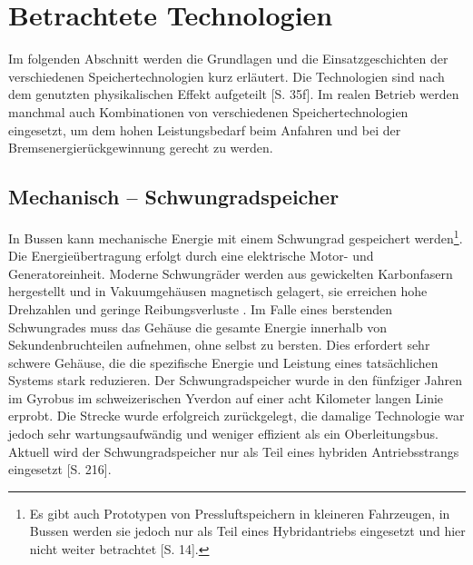 \section{Betrachtete Technologien}
Im folgenden Abschnitt werden die Grundlagen und die Einsatzgeschichten der verschiedenen Speichertechnologien kurz erläutert. Die Technologien sind nach dem genutzten physikalischen Effekt aufgeteilt \cite{Sterner:2014}[S. 35f]. Im realen Betrieb werden manchmal auch Kombinationen von verschiedenen Speichertechnologien eingesetzt, um dem hohen Leistungsbedarf beim Anfahren und bei der Bremsenergierückgewinnung gerecht zu werden.
\subsection{Mechanisch – Schwungradspeicher} %
In Bussen kann mechanische Energie mit einem Schwungrad gespeichert werden\footnote{Es gibt auch Prototypen von Pressluftspeichern in kleineren Fahrzeugen, in Bussen werden sie jedoch nur als Teil eines Hybridantriebs eingesetzt und hier nicht weiter betrachtet \cite{Sebastian-Naumann:2014}[S. 14].}. Die Energieübertragung erfolgt durch eine elektrische Motor- und Generatoreinheit. Moderne Schwungräder werden aus gewickelten Karbonfasern hergestellt und in Vakuumgehäusen magnetisch gelagert, sie erreichen hohe Drehzahlen und geringe Reibungsverluste \cite{993788}. Im Falle eines berstenden Schwungrades muss das Gehäuse die gesamte Energie innerhalb von Sekundenbruchteilen aufnehmen, ohne selbst zu bersten. Dies erfordert sehr schwere Gehäuse, die die spezifische Energie und Leistung eines tatsächlichen Systems stark reduzieren. Der Schwungradspeicher wurde in den fünfziger Jahren im Gyrobus im schweizerischen Yverdon auf einer acht Kilometer langen Linie erprobt. Die Strecke wurde erfolgreich zurückgelegt, die damalige Technologie war jedoch sehr wartungsaufwändig und weniger effizient als ein Oberleitungsbus. Aktuell wird der Schwungradspeicher nur als Teil eines hybriden Antriebsstrangs eingesetzt \cite{tub_aleph001746639}[S. 216].
